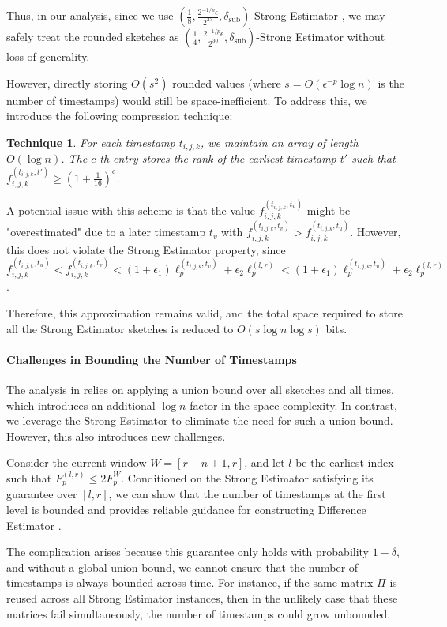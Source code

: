 \documentclass{article}
\newcommand{\est}{\textsf{Strong Estimator }}
\newcommand{\dif}{\textsf{Difference Estimator }}
\theoremstyle{plain}
\newtheorem{tech}[theorem]{Technique}
\begin{document}
Thus, in our analysis, since we use $(\frac{1}{8}, \frac{2^{-1/p} \epsilon}{2^{32}}, \delta_{\text{sub}})$-\est, we may safely treat the rounded sketches as $(\frac{1}{4}, \frac{2^{-1/p} \epsilon}{2^{30}}, \delta_{\text{sub}})$-\est without loss of generality.

However, directly storing $O(s^2)$ rounded values (where $s = O(\epsilon^{-p} \log n)$ is the number of timestamps) would still be space-inefficient. To address this, we introduce the following compression technique:

\begin{tech}\label{rounding tech} For each timestamp $t_{i,j,k}$, we maintain an array of length $O(\log n)$. The $c$-th entry stores the rank of the earliest timestamp $t'$ such that $f_{i,j,k}^{(t_{i,j,k}, t')} \ge (1 + \frac{1}{16})^c$. \end{tech}

A potential issue with this scheme is that the value $f_{i,j,k}^{(t_{i,j,k}, t_u)}$ might be "overestimated" due to a later timestamp $t_v$ with $f_{i,j,k}^{(t_{i,j,k}, t_v)} > f_{i,j,k}^{(t_{i,j,k}, t_u)}$. However, this does not violate the \est property, since $f_{i, j, k} ^ {(t_{i, j, k}, t_u)} < f_{i, j, k} ^ {(t_{i, j, k}, t_v)} < (1+\epsilon_1) \ell_p ^ {(t_{i,j,k}, t_v)} + \epsilon_2 \ell_p ^ {(l,r)} < (1+\epsilon_1) \ell_p ^ {(t_{i,j,k}, t_u)} + \epsilon_2 \ell_p ^ {(l,r)}$. 

Therefore, this approximation remains valid, and the total space required to store all the \est sketches is reduced to $O(s \log n \log s)$ bits.
\paragraph{Challenges in Bounding the Number of Timestamps}

The analysis in \cite{woodruff2022tight} relies on applying a union bound over all sketches and all times, which introduces an additional $\log n$ factor in the space complexity. In contrast, we leverage the \est to eliminate the need for such a union bound. However, this also introduces new challenges.

Consider the current window $W = [r - n + 1, r]$, and let $l$ be the earliest index such that $F_p^{(l, r)} \le 2 F_p^W$. Conditioned on the \est satisfying its guarantee over $[l, r]$, we can show that the number of timestamps at the first level is bounded and provides reliable guidance for constructing \dif.

The complication arises because this guarantee only holds with probability $1 - \delta$, and without a global union bound, we cannot ensure that the number of timestamps is always bounded across time. For instance, if the same matrix $\Pi$ is reused across all \est instances, then in the unlikely case that these matrices fail simultaneously, the number of timestamps could grow unbounded.
\end{document}
